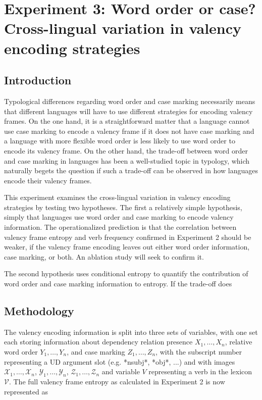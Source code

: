


\section{Experiment 3: Word order or case? Cross-lingual variation in valency encoding strategies}\label{sec:exp3-ablation}
\subsection{Introduction}

Typological differences regarding word order and case marking necessarily means that different languages will have to use different strategies for encoding valency frames. On the one hand, it is a straightforward matter that a language cannot use case marking to encode a valency frame if it does not have case marking and a language with more flexible word order is less likely to use word order to encode its valency frame. On the other hand, the trade-off between word order and case marking in languages has been a well-studied topic in typology, which naturally begets the question if such a trade-off can be observed in how languages encode their valency frames.

This experiment examines the cross-lingual variation in valency encoding strategies by testing two hypotheses. The first a relatively simple hypothesis, simply that languages use word order and case marking to encode valency information. The operationalized prediction is that the correlation between valency frame entropy and verb frequency confirmed in Experiment 2 should be weaker, if the valency frame encoding leaves out either word order information, case marking, or both. An ablation study will seek to confirm it.

The second hypothesis uses conditional entropy to quantify the contribution of word order and case marking information to entropy. If the trade-off does 

\subsection{Methodology}

The valency encoding information is split into three sets of variables, with one set each storing information about dependency relation presence $X_1,\ldots,X_n$, relative word order $Y_1,\ldots,Y_n$, and case marking $Z_1,\ldots,Z_n$, with the subscript number representing a UD argument slot (e.g. *nsubj*, *obj*, ...) and with images $\mathcal{X}_{1},\ldots,\mathcal{X}_{n}$,  $\mathcal{Y}_{1},\ldots,\mathcal{Y}_{n}$, $\mathcal{Z}_{1},\ldots,\mathcal{Z}_{n}$ and variable $V$ representing a verb in the lexicon $\mathcal{V}$. The full valency frame entropy as calculated in Experiment 2 is now represented as 

